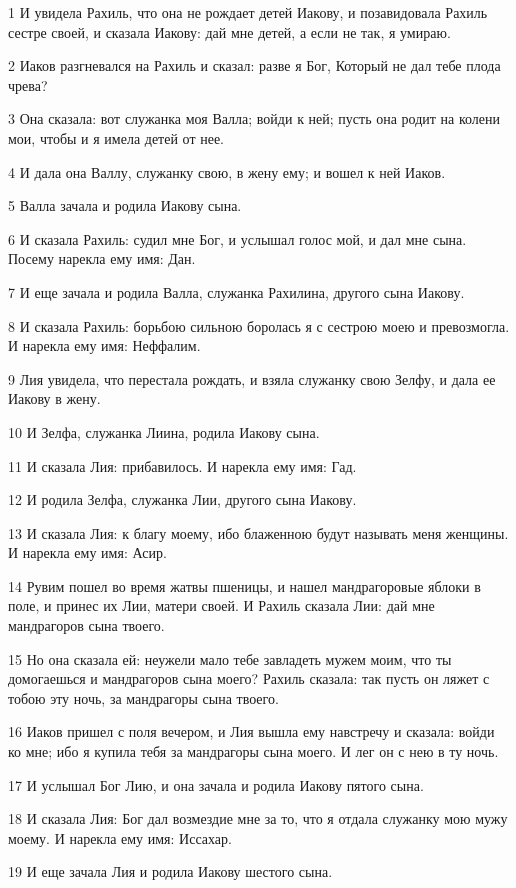 \par 1 И увидела Рахиль, что она не рождает детей Иакову, и позавидовала Рахиль сестре своей, и сказала Иакову: дай мне детей, а если не так, я умираю.
\par 2 Иаков разгневался на Рахиль и сказал: разве я Бог, Который не дал тебе плода чрева?
\par 3 Она сказала: вот служанка моя Валла; войди к ней; пусть она родит на колени мои, чтобы и я имела детей от нее.
\par 4 И дала она Валлу, служанку свою, в жену ему; и вошел к ней Иаков.
\par 5 Валла зачала и родила Иакову сына.
\par 6 И сказала Рахиль: судил мне Бог, и услышал голос мой, и дал мне сына. Посему нарекла ему имя: Дан.
\par 7 И еще зачала и родила Валла, служанка Рахилина, другого сына Иакову.
\par 8 И сказала Рахиль: борьбою сильною боролась я с сестрою моею и превозмогла. И нарекла ему имя: Неффалим.
\par 9 Лия увидела, что перестала рождать, и взяла служанку свою Зелфу, и дала ее Иакову в жену.
\par 10 И Зелфа, служанка Лиина, родила Иакову сына.
\par 11 И сказала Лия: прибавилось. И нарекла ему имя: Гад.
\par 12 И родила Зелфа, служанка Лии, другого сына Иакову.
\par 13 И сказала Лия: к благу моему, ибо блаженною будут называть меня женщины. И нарекла ему имя: Асир.
\par 14 Рувим пошел во время жатвы пшеницы, и нашел мандрагоровые яблоки в поле, и принес их Лии, матери своей. И Рахиль сказала Лии: дай мне мандрагоров сына твоего.
\par 15 Но она сказала ей: неужели мало тебе завладеть мужем моим, что ты домогаешься и мандрагоров сына моего? Рахиль сказала: так пусть он ляжет с тобою эту ночь, за мандрагоры сына твоего.
\par 16 Иаков пришел с поля вечером, и Лия вышла ему навстречу и сказала: войди ко мне; ибо я купила тебя за мандрагоры сына моего. И лег он с нею в ту ночь.
\par 17 И услышал Бог Лию, и она зачала и родила Иакову пятого сына.
\par 18 И сказала Лия: Бог дал возмездие мне за то, что я отдала служанку мою мужу моему. И нарекла ему имя: Иссахар.
\par 19 И еще зачала Лия и родила Иакову шестого сына.
